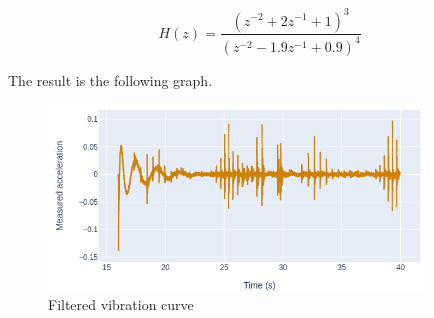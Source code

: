 \begin{equation}
H(z) = %
\frac{(z^{-2}+2z^{-1}+1)^3}{(z^{-2}-1.9z^{-1}+0.9)^4}
\end{equation}

    
    
    
    
    
The result is the following graph. 

\begin{figure}[!h]
    \raggedright
    \includegraphics[width=10cm]{images/stage_graphs/vibration_results/filtered_footsteps.png}
    \caption{Filtered vibration curve}
    \label{fig:filtered_footsteps}
\end{figure}

